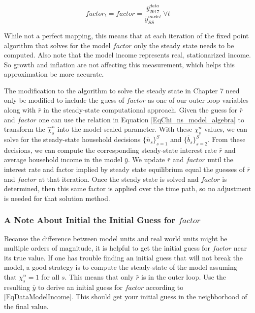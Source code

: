 \documentclass[letterpaper,12pt]{article}
\theoremstyle{definition}
\begin{document}
  \begin{equation}
    factor_{t}=factor=\frac{\bar{y}^{data}_{2017}}{\bar{y}^{model}_{SS}} \ \forall t
  \end{equation}

  While not a perfect mapping, this means that at each iteration of the fixed point algorithm that solves for the model $factor$ only the steady state needs to be computed.  Also note that the model income represents real, stationarized income.  So growth and inflation are not affecting this measurement, which helps this approximation be more accurate.

  The modification to the algorithm to solve the steady state in Chapter 7 need only be modified to include the guess of $factor$ as one of our outer-loop variables along with $\bar{r}$ in the steady-state computational approach.  Given the guess for $\bar{r}$ and $factor$ one can use the relation in Equation \ref{EqChi_ns_model_algebra} to transform the $\hat{\chi}^{n}_{s}$ into the model-scaled parameter. With these $\chi^n_s$ values, we can solve for the steady-state household decisions $\{\bar{n}_s\}_{s=1}^S$ and $\{\bar{b}_s\}_{s=2}^S$. From these decisions, we can compute the corresponding steady-state interest rate $\bar{r}$ and average household income in the model $\bar{y}$. We update $\bar{r}$ and $factor$ until the interest rate and factor implied by steady state equilibrium equal the guesses of $\bar{r}$ and $factor$ at that iteration.  Once the steady state is solved and $factor$ is determined, then this same factor is applied over the time path, so no adjustment is needed for that solution method.

  \subsubsection{A Note About Initial the Initial Guess for $factor$}
  Because the difference between model units and real world units might be multiple orders of magnitude, it is helpful to get the initial guess for $factor$ near its true value. If one has trouble finding an initial guess that will not break the model, a good strategy is to compute the steady-state of the model assuming that $\chi^n_s=1$ for all $s$. This means that only $\bar{r}$ is in the outer loop. Use the resulting $\bar{y}$ to derive an initial guess for $factor$ according to \eqref{EqDataModelIncome}. This should get your initial guess in the neighborhood of the final value.
\end{document}
